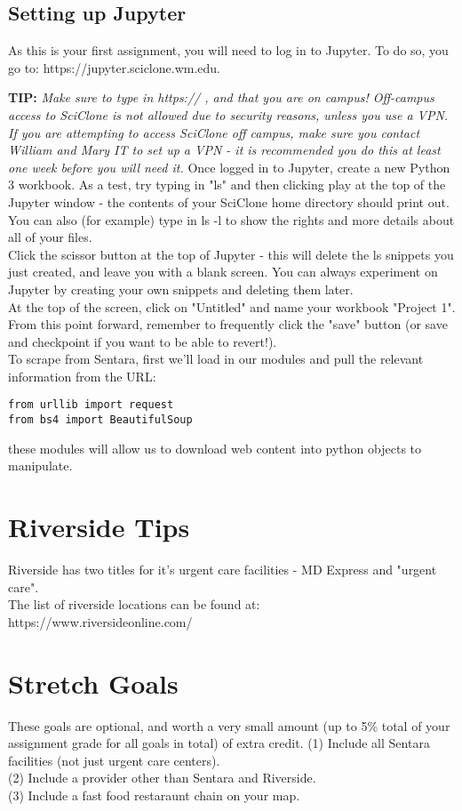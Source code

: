 \documentclass[a4paper, 11pt]{article}
\begin{document}
\subsection{Setting up Jupyter}
As this is your first assignment, you will need to log in to Jupyter.  To do so, you go to: https://jupyter.sciclone.wm.edu.\\\vspace{0.1in}

\textbf{TIP:} \textit{Make sure to type in https:// , and that you are on campus!  Off-campus access to SciClone is not allowed due to security reasons, unless you use a VPN. If you are attempting to access SciClone off campus, make sure you contact William and Mary IT to set up a VPN - it is recommended you do this at least one week before you will need it.}
\vspace{0.1in}
Once logged in to Jupyter, create a new Python 3 workbook. As a test, try typing in "ls" and then clicking play at the top of the Jupyter window - the contents of your SciClone home directory should print out.  You can also (for example) type in ls -l to show the rights and more details about all of your files.\\
Click the scissor button at the top of Jupyter - this will delete the ls snippets you just created, and leave you with a blank screen.  You can always experiment on Jupyter by creating your own snippets and deleting them later.\\
At the top of the screen, click on "Untitled" and name your workbook "Project 1".  From this point forward, remember to frequently click the "save" button (or save and checkpoint if you want to be able to revert!).\\

To scrape from Sentara, first we'll load in our modules and pull the relevant information from the URL:
\begin{lstlisting}
from urllib import request
from bs4 import BeautifulSoup
\end{lstlisting}
these modules will allow us to download web content into python objects to manipulate.

\section{Riverside Tips}
Riverside has two titles for it's urgent care facilities - MD Express and "urgent care".\\
The list of riverside locations can be found at:\\
https://www.riversideonline.com/

\section{Stretch Goals}
These goals are optional, and worth a very small amount (up to 5\% total of your assignment grade for all goals in total) of extra credit.
(1) Include all Sentara facilities (not just urgent care centers).\\
(2) Include a provider other than Sentara and Riverside.\\
(3) Include a fast food restaraunt chain on your map.
\end{document}
